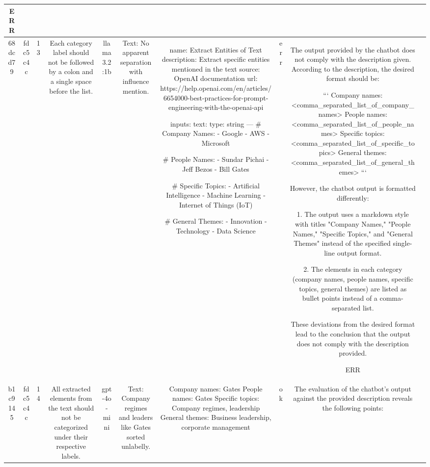 \begin{table}[h!]
\begin{tabular}{|c|c|c|c|c|c|c|c|c|c|}
ERR & \\
\hline
68dcd79 & fdc5c4c & 13 & Each category label should not be followed by a colon and a single space before the list. & llama3.2:1b & Text: No apparent separation with influence mention. & name: Extract Entities of Text
description: Extract specific entities mentioned in the text
source: OpenAI documentation
url: https://help.openai.com/en/articles/6654000-best-practices-for-prompt-engineering-with-the-openai-api

inputs:
  text:
    type: string
---
# Company Names: 
- Google
- AWS
- Microsoft

# People Names: 
- Sundar Pichai
- Jeff Bezos
- Bill Gates

# Specific Topics: 
- Artificial Intelligence
- Machine Learning
- Internet of Things (IoT)

# General Themes: 
- Innovation
- Technology
- Data Science & err & The output provided by the chatbot does not comply with the description given. According to the description, the desired format should be:

```
Company names: <comma_separated_list_of_company_names>
People names: <comma_separated_list_of_people_names>
Specific topics: <comma_separated_list_of_specific_topics>
General themes: <comma_separated_list_of_general_themes>
```

However, the chatbot output is formatted differently:

1. The output uses a markdown style with titles "Company Names," "People Names," "Specific Topics," and "General Themes" instead of the specified single-line output format.
   
2. The elements in each category (company names, people names, specific topics, general themes) are listed as bullet points instead of a comma-separated list.

These deviations from the desired format lead to the conclusion that the output does not comply with the description provided.

ERR & \\
\hline
b1c9145 & fdc5c4c & 14 & All extracted elements from the text should not be categorized under their respective labels. & gpt-4o-mini & Text: Company regimes and leaders like Gates sorted unlabelly. & Company names: Gates
People names: Gates
Specific topics: Company regimes, leadership
General themes: Business leadership, corporate management & ok & The evaluation of the chatbot's output against the provided description reveals the following points:


\end{tabular}
\end{table}
